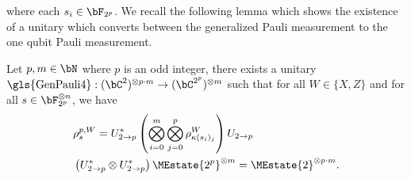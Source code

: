 where each $s_i \in \bF_{2^p}$. We recall the following lemma which shows the existence of a unitary which converts between the generalized Pauli measurement to the one qubit Pauli measurement.
\begin{lemma} \label{lem:PaulitogeneralPauli}
	Let $p, m \in \bN$ where $p$ is an odd integer, there exists a unitary $\text{\gls{GenPauli4}}:  (\bC^{2})^{\otimes p \cdot m} \rightarrow (\bC^{2^p})^{\otimes m}$ such that for all $W \in \{X,Z\}$ and for all $s\in \bF_{2^p}^{\otimes n}$, we have 
	\begin{align*}
		&\rho^{p, W}_s =  U_{2 \rightarrow p}^* \left( \bigotimes^{m}_{i = 0} \bigotimes^{p}_{j = 0} \rho^{W}_{\kappa(s_i)_j}  \right)U_{2 \rightarrow p} \\
		&\left(U_{2 \rightarrow p}^* \otimes U_{2 \rightarrow p}^* \right)\MEstate{2^p}^{\otimes m} =  \MEstate{2}^{\otimes p \cdot m}. 
	\end{align*}
\end{lemma}



